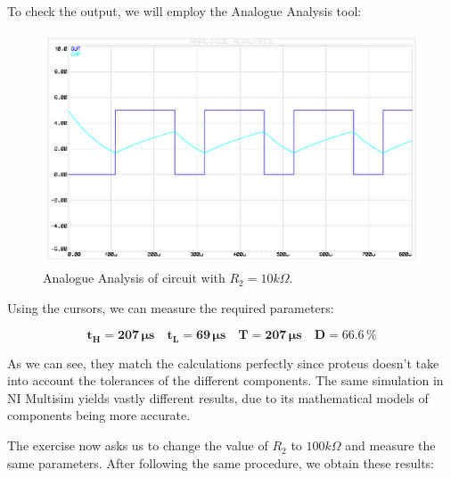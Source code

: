 \documentclass[a4paper, 11pt, oneside]{article}
\begin{document}
\clearpage

To check the output, we will employ the Analogue Analysis tool:

\begin{figure}[H]
    \centering
    \includegraphics[scale = 0.75]{Graphics/Practice 2/GRAPHICS/555/GRAPHS/PROTEUS/ANALOGUE/555_ASTABLE_ANALOGUE_10K.PDF}
    \caption{Analogue Analysis of circuit with $R_2 = 10k \Omega$.}
    \label{fig:555_ASTABLE_ANALOGUE_10K}
\end{figure}


Using the cursors, we can measure the required parameters:

\begin{equation*}
    \mathbf{t_H} = \mathbf{207 \, \si\micro \text{s}} \quad
    \mathbf{t_L} = \mathbf{69 \, \si\micro \text{s}} \quad
    \mathbf{T} = \mathbf{207 \, \si\micro \text{s}} \quad
    \mathbf{D} =  \mathbf{66.6 \, \text{\%}}
\end{equation*}\medskip

As we can see, they match the calculations perfectly since proteus doesn't take into account the tolerances of the different components. The same simulation in NI Multisim yields vastly different results, due to its mathematical models of components being more accurate.\medskip

\clearpage

The exercise now asks us to change the value of $R_2$ to $100k\Omega$ and measure the same parameters. After following the same procedure, we obtain these results:
\end{document}
